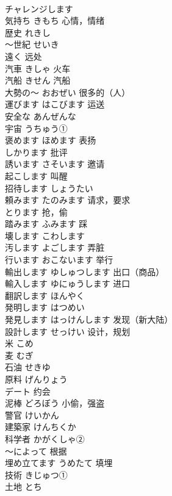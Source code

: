 \documentclass[8pt]{extreport}
\begin{document}
\begin{CJK}{UTF8}{min}
\\	チャレンジします	
\\	気持ち	きもち 心情，情绪	
\\	歴史	れきし	
\\	〜世紀	せいき	
\\	遠く	远处	
\\	汽車	きしゃ 火车	
\\	汽船	きせん 汽船	
\\	大勢の～	おおぜい 很多的（人）	
\\	運びます	はこびます 运送	
\\	安全な	あんぜんな	
\\	宇宙	うちゅう①	
\\	褒めます	ほめます 表扬	
\\	しかります	批评	
\\	誘います	さそいます 邀请	
\\	起こします	叫醒	
\\	招待します	しょうたい	
\\	頼みます	たのみます 请求，要求	
\\	とります	抢，偷	
\\	踏みます	ふみます 踩	
\\	壊します	こわします	
\\	汚します	よごします 弄脏	
\\	行います	おこないます 举行	
\\	輸出します	ゆしゅつします 出口（商品）	
\\	輸入します	ゆにゅうします 进口	
\\	翻訳します	ほんやく	
\\	発明します	はつめい	
\\	発見します	はっけんします 发现（新大陆）	
\\	設計します	せっけい 设计，规划	
\\	米	こめ	
\\	麦	むぎ　
\\	石油	せきゆ	
\\	原料	げんりょう	
\\	デート	约会	
\\	泥棒	どろぼう 小偷，强盗	
\\	警官	けいかん	
\\	建築家	けんちくか	
\\	科学者	かがくしゃ②	
\\	～によって	根据	
\\	埋め立てます	うめたて 填埋	
\\	技術	きじゅつ①	
\\	土地	とち	

\end{CJK}
\end{document}
